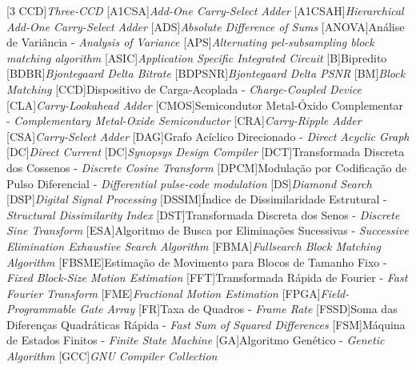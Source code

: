 \begin{acronym}
[3 CCD]{\textit{Three-CCD}}
[A1CSA]{\textit{Add-One Carry-Select Adder}}
[A1CSAH]{\textit{Hierarchical Add-One Carry-Select Adder}}
[ADS]{\textit{Absolute Difference of Sums}}
[ANOVA]{Análise de Variância - \textit{Analysis of Variance}}
[APS]{\textit{Alternating pel-subsampling block matching algorithm}}
[ASIC]{\textit{Application Specific Integrated Circuit}}
[B]{Bipredito}
[BDBR]{\textit{Bjontegaard Delta Bitrate}}
[BDPSNR]{\textit{Bjontegaard Delta PSNR}}
[BM]{\textit{Block Matching}}
[CCD]{Dispositivo de Carga-Acoplada - \textit{Charge-Coupled Device}}
[CLA]{\textit{Carry-Lookahead Adder}}
[CMOS]{Semicondutor Metal-Óxido Complementar - \textit{Complementary Metal-Oxide Semiconductor}}
[CRA]{\textit{Carry-Ripple Adder}}
[CSA]{\textit{Carry-Select Adder}}
[DAG]{Grafo Acíclico Direcionado - \textit{Direct Acyclic Graph}}
[DC]{\textit{Direct Current}}
[DC]{\textit{Synopsys Design Compiler}}
[DCT]{Transformada Discreta dos Cossenos - \textit{Discrete Cosine Transform}}
[DPCM]{Modulação por Codificação de Pulso Diferencial - \textit{Differential pulse-code modulation}}
[DS]{\textit{Diamond Search}}
[DSP]{\textit{Digital Signal Processing}}
[DSSIM]{Índice de Dissimilaridade Estrutural - \textit{Structural Dissimilarity Index}}
[DST]{Transformada Discreta dos Senos - \textit{Discrete Sine Transform}}
[ESA]{Algoritmo de Busca por Eliminações Sucessivas - \textit {Successive Elimination Exhaustive Search Algorithm}}
[FBMA]{\textit{Fullsearch Block Matching Algorithm}}
[FBSME]{Estimação de Movimento para Blocos de Tamanho Fixo - \textit{Fixed Block-Size Motion Estimation}}
[FFT]{Transformada Rápida de Fourier - \textit{Fast Fourier Transform}}
[FME]{\textit{Fractional Motion Estimation}}
[FPGA]{\textit{Field-Programmable Gate Array}}
[FR]{Taxa de Quadros - \textit{Frame Rate}}
[FSSD]{Soma das Diferenças Quadráticas Rápida - \textit{Fast Sum of Squared Differences}}
[FSM]{Máquina de Estados Finitos - \textit{Finite State Machine}}
[GA]{Algoritmo Genético - \textit{Genetic Algorithm}}
[GCC]{\textit{GNU Compiler Collection}}

\end{acronym}
